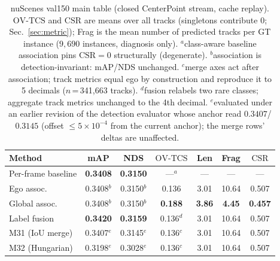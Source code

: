 \documentclass[10pt,twocolumn,letterpaper]{article}
\newcommand{\ovtcs}{\mathrm{OV\text{-}TCS}}
\newcommand{\csr}{\mathrm{CSR}}
\begin{document}
\begin{table}[t]
\centering\small
\setlength{\tabcolsep}{3.2pt}
\begin{tabular}{lcccccc}
\toprule
Method & mAP & NDS & $\ovtcs$ & Len & Frag & $\csr$ \\
\midrule
Per-frame baseline & \textbf{0.3408} & \textbf{0.3150} & ---$^a$ & --- & --- & --- \\
Ego assoc. & 0.3408$^b$ & 0.3150$^b$ & 0.136 & 3.01 & 10.64 & 0.507 \\
Global assoc. & 0.3408$^b$ & 0.3150$^b$ & \textbf{0.188} & \textbf{3.86} & \textbf{4.45} & \textbf{0.457} \\
Label fusion & \textbf{0.3420} & \textbf{0.3159} & 0.136$^d$ & 3.01 & 10.64 & 0.507 \\
M31 (IoU merge) & 0.3407$^e$ & 0.3145$^e$ & 0.136$^c$ & 3.01 & 10.64 & 0.507 \\
M32 (Hungarian) & 0.3198$^e$ & 0.3028$^e$ & 0.136$^c$ & 3.01 & 10.64 & 0.507 \\
\bottomrule
\end{tabular}
\caption{nuScenes val150 main table (closed CenterPoint stream, cache
replay). $\ovtcs$ and $\csr$ are means over all tracks (singletons contribute
$0$; Sec.~\ref{sec:metric}); Frag is the mean number of predicted tracks per
GT instance ($9{,}690$ instances, diagnosis only).
$^a$class-aware baseline association pins $\csr{=}0$ structurally
(degenerate). $^b$association is detection-invariant: mAP/NDS unchanged.
$^c$merge axes act after association; track metrics equal ego by construction
and reproduce it to 5 decimals ($n$\,=\,341{,}663 tracks). $^d$fusion relabels
two rare classes; aggregate track metrics unchanged to the 4th decimal.
$^e$evaluated under an earlier revision of the detection evaluator whose
anchor read $0.3407$/$0.3145$ (offset $\le 5{\times}10^{-4}$ from the current
anchor); the merge rows' deltas are unaffected.}
\label{tab:main}
\end{table}
\end{document}
